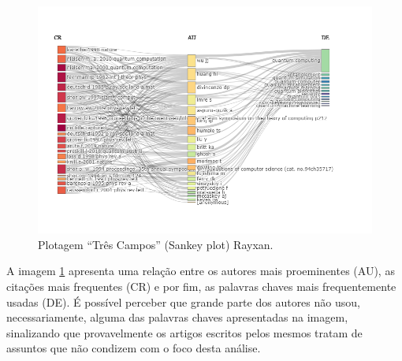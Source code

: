 \begin{figure}
    \centering
    \includegraphics[width=1\textwidth]{experiments/Rayxan/PesqBibliogr/ComputacaoQuantica/WoS-20220206/ThreeFieldsPlot.png}
    \caption{Plotagem ``Três Campos'' (Sankey plot) Rayxan.}
    \label{fig:three:fields:Rayxan}
\end{figure}

A imagem \ref{fig:three:fields:Rayxan} apresenta uma relação entre os autores mais proeminentes (AU), as citações mais frequentes (CR) e por fim, as palavras chaves mais frequentemente usadas (DE). É possível perceber que grande parte dos autores não usou, necessariamente, alguma das palavras chaves apresentadas na imagem, sinalizando que provavelmente os artigos escritos pelos mesmos tratam de assuntos que não condizem com o foco desta análise.